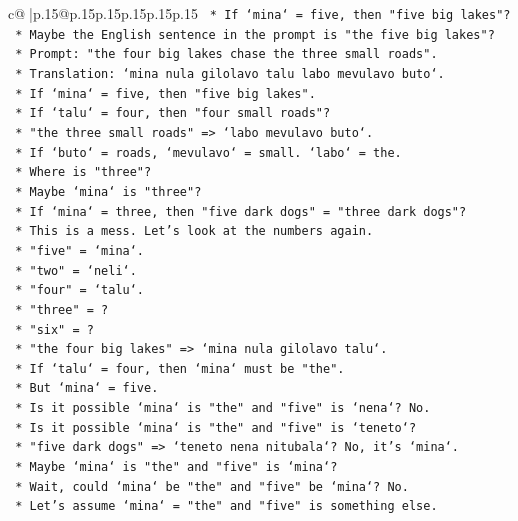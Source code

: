\documentclass{article}
\begin{document}
{\begin{supertabular}{c@{$\;$}|p{.15\linewidth}@{}p{.15\linewidth}p{.15\linewidth}p{.15\linewidth}p{.15\linewidth}p{.15\linewidth}}
{{{\texttt{    *   If `mina` = five, then "five big lakes"?} \\
\texttt{    *   Maybe the English sentence in the prompt is "the five big lakes"?} \\
\texttt{    *   Prompt: "the four big lakes chase the three small roads".} \\
\texttt{    *   Translation: `mina nula gilolavo talu labo mevulavo buto`.} \\
\texttt{    *   If `mina` = five, then "five big lakes".} \\
\texttt{    *   If `talu` = four, then "four small roads"?} \\
\texttt{    *   "the three small roads" => `labo mevulavo buto`.} \\
\texttt{    *   If `buto` = roads, `mevulavo` = small. `labo` = the.} \\
\texttt{    *   Where is "three"?} \\
\texttt{    *   Maybe `mina` is "three"?} \\
\texttt{    *   If `mina` = three, then "five dark dogs" = "three dark dogs"?} \\
\texttt{    *   This is a mess. Let's look at the numbers again.} \\
\texttt{    *   "five" = `mina`.} \\
\texttt{    *   "two" = `neli`.} \\
\texttt{    *   "four" = `talu`.} \\
\texttt{    *   "three" = ?} \\
\texttt{    *   "six" = ?} \\
\texttt{    *   "the four big lakes" => `mina nula gilolavo talu`.} \\
\texttt{    *   If `talu` = four, then `mina` must be "the".} \\
\texttt{    *   But `mina` = five.} \\
\texttt{    *   Is it possible `mina` is "the" and "five" is `nena`? No.} \\
\texttt{    *   Is it possible `mina` is "the" and "five" is `teneto`?} \\
\texttt{    *   "five dark dogs" => `teneto nena nitubala`? No, it's `mina`.} \\
\texttt{    *   Maybe `mina` is "the" and "five" is `mina`?} \\
\texttt{    *   Wait, could `mina` be "the" and "five" be `mina`? No.} \\
\texttt{    *   Let's assume `mina` = "the" and "five" is something else.} \\
}}}
\end{supertabular}}
\end{document}
